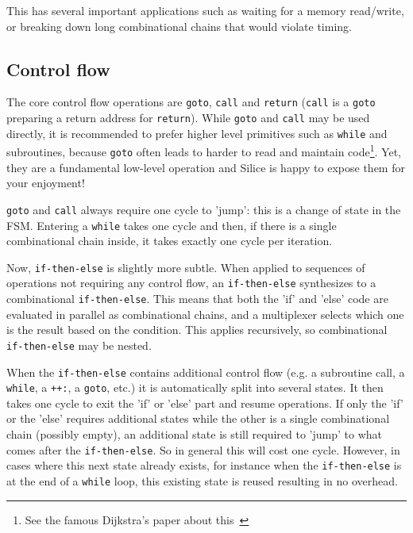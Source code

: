 \documentclass[a4]{article}
\newcommand\silice{Silice}
\begin{document}
This has several important applications such as waiting for a memory read/write, or breaking down long combinational chains that would violate timing.


\subsection{Control flow}

The core control flow operations are \texttt{goto}, \texttt{call} and \texttt{return} (\texttt{call} is a \texttt{goto} preparing a return address for \texttt{return}). 
%
While \texttt{goto} and \texttt{call} may be used directly, it is recommended to prefer higher level primitives such as \texttt{while} and subroutines, because \texttt{goto} often leads to harder to read and maintain code\footnote{See the famous Dijkstra's paper about this~\cite{dijkstra}}. 
Yet, they are a fundamental low-level operation and \silice{} is happy to expose them for your enjoyment!

\texttt{goto} and \texttt{call} always require one cycle to 'jump': this is a change of state in the FSM. Entering a \texttt{while} takes one cycle and then, if there is a single combinational chain inside, it takes exactly one cycle per iteration. 

Now, \texttt{if-then-else} is slightly more subtle. When applied to sequences of operations not requiring any control flow, an \texttt{if-then-else} synthesizes to a combinational \texttt{if-then-else}. This means that both the 'if' and 'else' code are evaluated in parallel as combinational chains, and a multiplexer selects which one is the result based on the condition. This applies recursively, so combinational \texttt{if-then-else} may be nested.

When the \texttt{if-then-else} contains additional control flow (e.g. a subroutine call, a \texttt{while}, a \texttt{++:}, a \texttt{goto}, etc.) it is automatically split into several states. It then takes one cycle to exit the 'if' or 'else' part and resume operations.
If only the 'if' or the 'else' requires additional states while the other is a single combinational chain (possibly empty), an additional state is still required to 'jump' to what comes after the \texttt{if-then-else}. So in general this will cost one cycle. However, in cases where this next state already exists, for instance when the \texttt{if-then-else} is at the end of a \texttt{while} loop, this existing state is reused resulting in no overhead.
\end{document}
